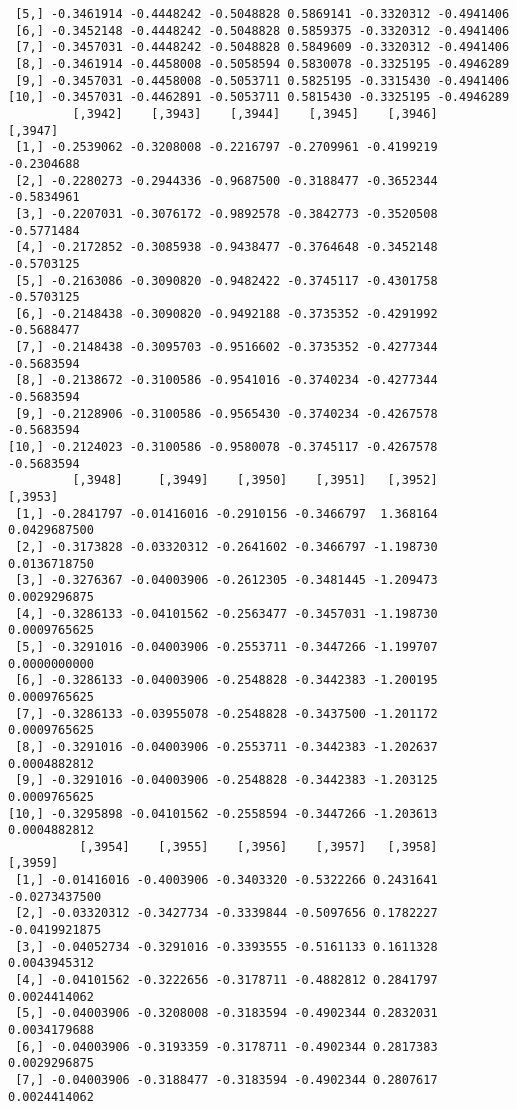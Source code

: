 \documentclass[
  letterpaper,
  DIV=11,
  numbers=noendperiod]{scrreprt}
\begin{document}
\begin{verbatim}
 [5,] -0.3461914 -0.4448242 -0.5048828 0.5869141 -0.3320312 -0.4941406
 [6,] -0.3452148 -0.4448242 -0.5048828 0.5859375 -0.3320312 -0.4941406
 [7,] -0.3457031 -0.4448242 -0.5048828 0.5849609 -0.3320312 -0.4941406
 [8,] -0.3461914 -0.4458008 -0.5058594 0.5830078 -0.3325195 -0.4946289
 [9,] -0.3457031 -0.4458008 -0.5053711 0.5825195 -0.3315430 -0.4941406
[10,] -0.3457031 -0.4462891 -0.5053711 0.5815430 -0.3325195 -0.4946289
         [,3942]    [,3943]    [,3944]    [,3945]    [,3946]    [,3947]
 [1,] -0.2539062 -0.3208008 -0.2216797 -0.2709961 -0.4199219 -0.2304688
 [2,] -0.2280273 -0.2944336 -0.9687500 -0.3188477 -0.3652344 -0.5834961
 [3,] -0.2207031 -0.3076172 -0.9892578 -0.3842773 -0.3520508 -0.5771484
 [4,] -0.2172852 -0.3085938 -0.9438477 -0.3764648 -0.3452148 -0.5703125
 [5,] -0.2163086 -0.3090820 -0.9482422 -0.3745117 -0.4301758 -0.5703125
 [6,] -0.2148438 -0.3090820 -0.9492188 -0.3735352 -0.4291992 -0.5688477
 [7,] -0.2148438 -0.3095703 -0.9516602 -0.3735352 -0.4277344 -0.5683594
 [8,] -0.2138672 -0.3100586 -0.9541016 -0.3740234 -0.4277344 -0.5683594
 [9,] -0.2128906 -0.3100586 -0.9565430 -0.3740234 -0.4267578 -0.5683594
[10,] -0.2124023 -0.3100586 -0.9580078 -0.3745117 -0.4267578 -0.5683594
         [,3948]     [,3949]    [,3950]    [,3951]   [,3952]      [,3953]
 [1,] -0.2841797 -0.01416016 -0.2910156 -0.3466797  1.368164 0.0429687500
 [2,] -0.3173828 -0.03320312 -0.2641602 -0.3466797 -1.198730 0.0136718750
 [3,] -0.3276367 -0.04003906 -0.2612305 -0.3481445 -1.209473 0.0029296875
 [4,] -0.3286133 -0.04101562 -0.2563477 -0.3457031 -1.198730 0.0009765625
 [5,] -0.3291016 -0.04003906 -0.2553711 -0.3447266 -1.199707 0.0000000000
 [6,] -0.3286133 -0.04003906 -0.2548828 -0.3442383 -1.200195 0.0009765625
 [7,] -0.3286133 -0.03955078 -0.2548828 -0.3437500 -1.201172 0.0009765625
 [8,] -0.3291016 -0.04003906 -0.2553711 -0.3442383 -1.202637 0.0004882812
 [9,] -0.3291016 -0.04003906 -0.2548828 -0.3442383 -1.203125 0.0009765625
[10,] -0.3295898 -0.04101562 -0.2558594 -0.3447266 -1.203613 0.0004882812
          [,3954]    [,3955]    [,3956]    [,3957]   [,3958]       [,3959]
 [1,] -0.01416016 -0.4003906 -0.3403320 -0.5322266 0.2431641 -0.0273437500
 [2,] -0.03320312 -0.3427734 -0.3339844 -0.5097656 0.1782227 -0.0419921875
 [3,] -0.04052734 -0.3291016 -0.3393555 -0.5161133 0.1611328  0.0043945312
 [4,] -0.04101562 -0.3222656 -0.3178711 -0.4882812 0.2841797  0.0024414062
 [5,] -0.04003906 -0.3208008 -0.3183594 -0.4902344 0.2832031  0.0034179688
 [6,] -0.04003906 -0.3193359 -0.3178711 -0.4902344 0.2817383  0.0029296875
 [7,] -0.04003906 -0.3188477 -0.3183594 -0.4902344 0.2807617  0.0024414062

\end{verbatim}
\end{document}
